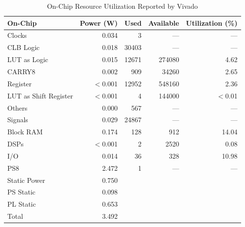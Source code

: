 \begin{table}[ht]
\centering
\begin{tabular}{|l|r|r|r|r|}
\hline
On-Chip & Power (W) & Used & Available & Utilization (\%) \\ \hline
Clocks                  & 0.034   & 3     & ---    & ---      \\ \hline
CLB Logic               & 0.018   & 30403 & ---    & ---      \\ \hline
\quad LUT as Logic      & 0.015   & 12671 & 274080 & 4.62     \\ \hline
\quad CARRY8            & 0.002   & 909   & 34260  & 2.65     \\ \hline
\quad Register          & $<$0.001& 12952 & 548160 & 2.36     \\ \hline
\quad LUT as Shift Register & $<$0.001 & 4   & 144000 & $<$0.01 \\ \hline
\quad Others            & 0.000   & 567   & ---    & ---      \\ \hline
Signals                 & 0.029   & 24867 & ---    & ---      \\ \hline
Block RAM               & 0.174   & 128   & 912    & 14.04    \\ \hline
DSPs                    & $<$0.001& 2     & 2520   & 0.08     \\ \hline
I/O                     & 0.014   & 36    & 328    & 10.98    \\ \hline
PS8                     & 2.472   & 1     & ---    & ---      \\ \hline
Static Power            & 0.750   &       &        &          \\ \hline
\quad PS Static         & 0.098   &       &        &          \\ \hline
\quad PL Static         & 0.653   &       &        &          \\ \hline
Total                   & 3.492   &       &        &          \\ \hline
\end{tabular}
\caption{On-Chip Resource Utilization Reported by Vivado}
\label{table:chip_utilization}
\end{table}
